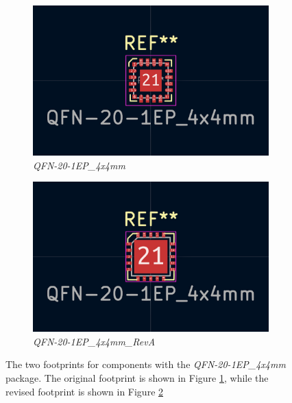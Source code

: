 \begin{figure}[b]
  \centering
  \begin{subfigure}{.5\textwidth}
    \centering
    \includegraphics[width=.8\linewidth]{Figures/kicad/QFN-20-1EP_4x4mm}
    \caption{\emph{QFN-20-1EP\_4x4mm}}
    \label{fig:FootprintQFN204x4_Original}
  \end{subfigure}%
  \begin{subfigure}{.5\textwidth}
    \centering
    \includegraphics[width=.8\linewidth]{Figures/kicad/QFN-20-1EP_4x4mm_RevA}
    \caption{\emph{QFN-20-1EP\_4x4mm\_RevA}}
    \label{fig:FootprintQFN204x4_RevA}
  \end{subfigure}
  \caption[Two versions of the QFN-20-1EP\_4x4mm package]{The two footprints for components with the \emph{QFN-20-1EP\_4x4mm} package. The original footprint is shown in Figure \ref{fig:FootprintQFN204x4_Original}, while the revised footprint is shown in Figure \ref{fig:FootprintQFN204x4_RevA}}
  \label{fig:FootprintQFN204x4}
\end{figure}

